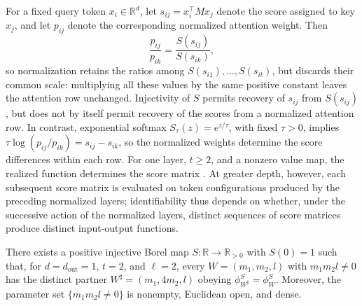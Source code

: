 \documentclass[mlmain]{jmlr}
\newcommand{\R}{\mathbb{R}}
\begin{document}
For a fixed query token $x_i\in\R^d$, let
$s_{ij}=x_i^\top Mx_j$ denote the score assigned to key $x_j$, and let
$p_{ij}$ denote the corresponding normalized attention weight.  Then
\begin{equation}
 \frac{p_{ij}}{p_{ik}}
 =
 \frac{S(s_{ij})}{S(s_{ik})},
 \label{eq:row-odds}
\end{equation}
so normalization retains the ratios among $S(s_{i1}),\ldots,S(s_{it})$, but
discards their common scale: multiplying all these values by the same
positive constant leaves the attention row unchanged.  Injectivity of $S$
permits recovery of $s_{ij}$ from $S(s_{ij})$, but does not by itself permit
recovery of the scores from a normalized attention row.  In contrast, exponential
softmax $S_\tau(z)=e^{z/\tau}$, with fixed $\tau>0$, implies
$\tau\log(p_{ij}/p_{ik})=s_{ij}-s_{ik}$, so the normalized weights determine
the score differences within each row.  For one layer, $t\ge2$, and a
nonzero value map, the realized function determines the score matrix
\citep{henry2025}.  At greater depth, however, each subsequent score matrix
is evaluated on token configurations produced by the preceding normalized
layers; identifiability thus depends on whether, under the successive action
of the normalized layers, distinct sequences of score matrices produce
distinct input-output functions.

\begin{theorem}
\label{thm:negative}
There exists a positive injective Borel map $S:\R\to\R_{>0}$ with $S(0)=1$ such
that, for $d=d_{\mathrm{out}}=1$, $t=2$, and $\ell=2$, every
$W=(m_1,m_2,l)$ with $m_1m_2l\ne0$ has the distinct partner
$W^\sharp=(m_1,4m_2,l)$ obeying $\phi_{W^\sharp}^S=\phi_W^S$.
Moreover, the parameter set $\{m_1m_2l\ne0\}$ is nonempty, Euclidean open, and dense.
\end{theorem}
\end{document}
